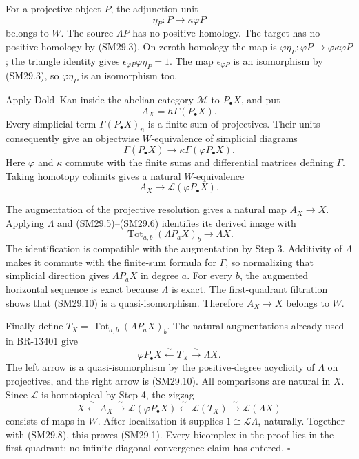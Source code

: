 For a projective object \(P\), the adjunction unit
\[
 \eta_P:P\longrightarrow\kappa\varphi P
\]
belongs to \(W\).  The source \(\Lambda P\) has no positive
homology.  The target has no positive homology by (SM29.3).
On zeroth homology the map is
\(\varphi\eta_P:\varphi P\to\varphi\kappa\varphi P\);
the triangle identity gives
\(\epsilon_{\varphi P}\varphi\eta_P=1\).
The map \(\epsilon_{\varphi P}\) is an isomorphism by
(SM29.3), so \(\varphi\eta_P\) is an isomorphism too.

Apply Dold--Kan inside the abelian category \(\mathcal M\)
to \(P_\bullet X\), and put
\[
 A_X=h\Gamma(P_\bullet X).
\]
Every simplicial term \(\Gamma(P_\bullet X)_n\) is a finite
sum of projectives.  Their units consequently give an
objectwise \(W\)-equivalence of simplicial diagrams
\[
 \Gamma(P_\bullet X)
       \longrightarrow\kappa\Gamma(\varphi P_\bullet X).
\]
Here \(\varphi\) and \(\kappa\) commute with the finite sums
and differential matrices defining \(\Gamma\).
Taking homotopy colimits gives a natural \(W\)-equivalence
\[
 A_X\longrightarrow\mathcal L(\varphi P_\bullet X).
 \tag{SM29.9}
\]

The augmentation of the projective resolution gives a natural
map \(A_X\to X\).  Applying \(\Lambda\) and (SM29.5)--(SM29.6)
identifies its derived image with
\[
 \operatorname{Tot}_{a,b}(\Lambda P_aX)_b
               \longrightarrow\Lambda X.
 \tag{SM29.10}
\]
The identification is compatible with the augmentation by
Step 3.  Additivity of \(\Lambda\) makes it commute with the
finite-sum formula for \(\Gamma\), so normalizing that simplicial
direction gives \(\Lambda P_aX\) in degree \(a\).
For every \(b\), the augmented horizontal sequence
is exact because \(\Lambda\) is exact.
The first-quadrant filtration shows that (SM29.10) is a
quasi-isomorphism.  Therefore \(A_X\to X\) belongs to \(W\).

Finally define
\(T_X=\operatorname{Tot}_{a,b}(\Lambda P_aX)_b\).
The natural augmentations already used in BR-13401 give
\[
 \varphi P_\bullet X
       \xleftarrow{\ \sim\ }T_X
       \xrightarrow{\ \sim\ }\Lambda X.
 \tag{SM29.11}
\]
The left arrow is a quasi-isomorphism by the positive-degree
acyclicity of \(\Lambda\) on projectives, and the right arrow
is (SM29.10).  All comparisons are natural in \(X\).
Since \(\mathcal L\) is homotopical by Step 4, the zigzag
\[
 X\xleftarrow{\ \sim\ }A_X
   \xrightarrow{\ \sim\ }\mathcal L(\varphi P_\bullet X)
   \xleftarrow{\ \sim\ }\mathcal L(T_X)
   \xrightarrow{\ \sim\ }\mathcal L(\Lambda X)
 \tag{SM29.12}
\]
consists of maps in \(W\).
After localization it supplies
\(1\cong\mathcal L\Lambda\), naturally.
Together with (SM29.8), this proves (SM29.1).
Every bicomplex in the proof lies in the first quadrant;
no infinite-diagonal convergence claim has entered.
\(\square\)

